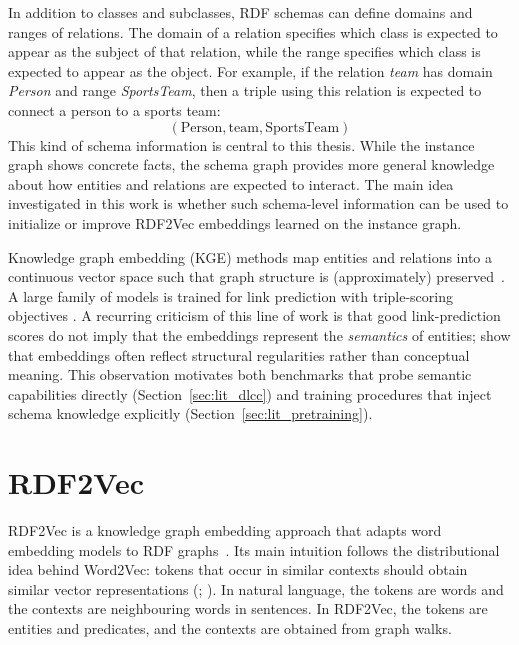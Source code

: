 \documentclass[a4paper,oneside,bibliography=totoc]{scrbook}
\begin{document}
In addition to classes and subclasses, RDF schemas can define domains and
ranges of relations. The domain of a relation specifies which class is expected
to appear as the subject of that relation, while the range specifies which class
is expected to appear as the object. For example, if the relation \textit{team}
has domain \textit{Person} and range \textit{SportsTeam}, then a triple using
this relation is expected to connect a person to a sports team:
\[
(\text{Person}, \text{team}, \text{SportsTeam})
\]
This kind of schema information is central to this thesis. While the instance
graph shows concrete facts, the schema graph provides more general knowledge
about how entities and relations are expected to interact. The main idea
investigated in this work is whether such schema-level information can be used
to initialize or improve RDF2Vec embeddings learned on the instance graph.

Knowledge graph embedding (KGE) methods map entities and relations into a
continuous vector space such that graph structure is (approximately)
preserved~\cite{wang_knowledge_2017}. A large family of models is trained for link prediction with
triple-scoring objectives \cite{ji_survey_2022, sardina_survey_2024}. A
recurring criticism of this line of work is that good link-prediction scores do
not imply that the embeddings represent the \emph{semantics} of entities;
\citet{jain2021semantics} show that embeddings often reflect structural
regularities rather than conceptual meaning. This observation motivates both
benchmarks that probe semantic capabilities directly
(Section~\ref{sec:lit_dlcc}) and training procedures that inject schema
knowledge explicitly (Section~\ref{sec:lit_pretraining}).

\section{RDF2Vec}
\label{sec:lit_rdf2vec}

RDF2Vec is a knowledge graph embedding approach that adapts word embedding
models to RDF graphs~\citep{ristoski2019rdf2vec,paulheim_embedding_2023,portisch_rdf2vec_family_2024}.
Its main intuition follows the distributional idea behind Word2Vec: tokens that
occur in similar contexts should obtain similar vector representations
(\citealp{mikolov_efficient_2013}; \citealp{mikolov_distributed_2013}). In natural language,
the tokens are words and the contexts are neighbouring words in sentences. In
RDF2Vec, the tokens are entities and predicates, and the contexts are obtained
from graph walks.
\end{document}
